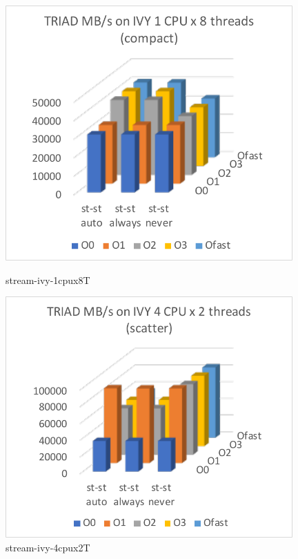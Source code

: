 \documentclass[conference]{IEEEtran}
\begin{document}
\begin{figure}[tb]
\begin{minipage}{0.48\hsize}
\includegraphics[width=0.98\textwidth]{figs/stream-ivy-1cpux8T.pdf}
\caption{stream-ivy-1cpux8T}
\label{fig:stream-ivy-1cpux8T}
\end{minipage}
\begin{minipage}{0.48\hsize}
\includegraphics[width=0.98\textwidth]{figs/stream-ivy-4cpux2T.pdf}
\caption{stream-ivy-4cpux2T}
\label{fig:stream-ivy-4cpux2T}
\end{minipage}
\end{figure}
\end{document}
